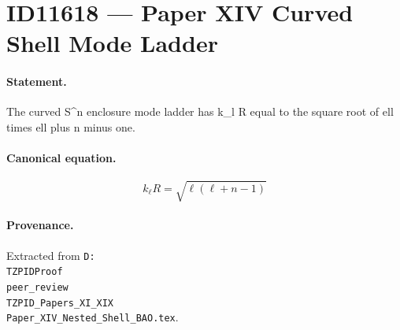 \section*{ID11618 --- Paper XIV Curved Shell Mode Ladder}

\paragraph{Statement.}
The curved S^n enclosure mode ladder has k_l R equal to the square root of ell times ell plus n minus one.

\paragraph{Canonical equation.}
\[
k_\ell R=\sqrt{\ell(\ell+n-1)}
\]

\paragraph{Provenance.}
Extracted from \texttt{D:\\TZPIDProof\\peer\_review\\TZPID\_Papers\_XI\_XIX\\Paper\_XIV\_Nested\_Shell\_BAO.tex}.
